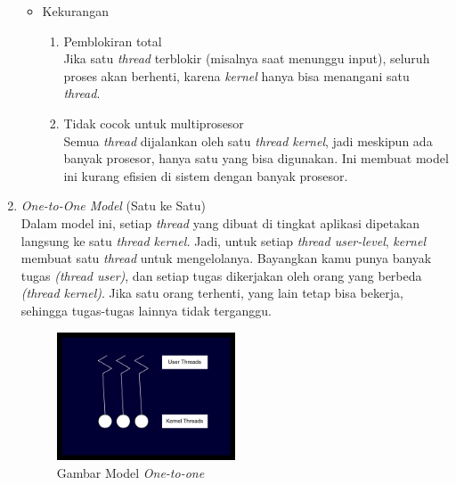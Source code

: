 \documentclass[12pt]{article}
\begin{document}
\begin{enumerate}
\begin{itemize}
        \item Kekurangan \\
            \begin{enumerate}
                \item Pemblokiran total \\
                Jika satu \textit{thread} terblokir (misalnya saat menunggu input), 
                seluruh proses akan berhenti, karena \textit{kernel} hanya bisa menangani satu \textit{thread}.
                \item Tidak cocok untuk multiprosesor \\
                Semua \textit{thread} dijalankan oleh satu \textit{thread kernel}, jadi meskipun ada banyak prosesor, hanya satu yang bisa 
                digunakan. Ini membuat model ini kurang efisien di sistem dengan banyak prosesor.
            \end{enumerate}
    \end{itemize}


    
    \item \textit{One-to-One Model} (Satu ke Satu)\\
    Dalam model ini, setiap \textit{thread} yang dibuat di tingkat aplikasi dipetakan langsung ke satu \textit{thread kernel.}
    Jadi, untuk setiap \textit{thread user-level}, \textit{kernel} membuat satu \textit{thread} untuk mengelolanya.
    Bayangkan kamu punya banyak tugas \textit{(thread user)}, dan setiap tugas dikerjakan 
    oleh orang yang berbeda \textit{(thread kernel)}. Jika satu orang terhenti, yang lain tetap bisa bekerja, sehingga tugas-tugas lainnya tidak terganggu.
    \begin{figure}[h]
        \centering
        \includegraphics[width=0.5\textwidth]{asset/gambar-model-multithreading-one-to-one.jpg}
        \caption{Gambar Model \textit{One-to-one}}
    \end{figure}


\end{enumerate}
\end{document}
